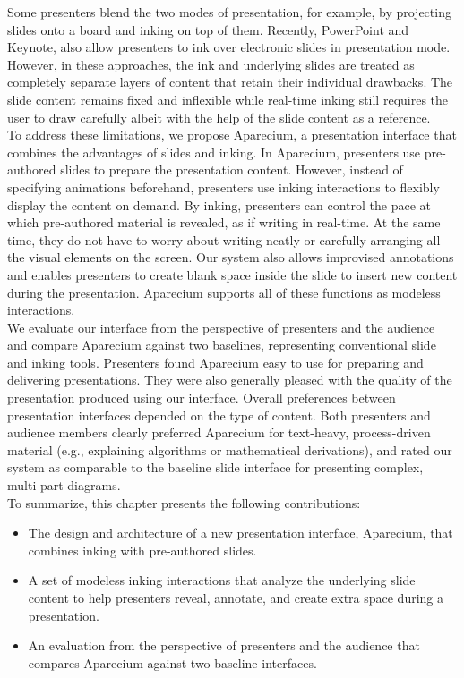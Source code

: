 Some presenters blend the two modes of presentation, for example, by projecting slides onto a board and inking on top of them. Recently, PowerPoint and Keynote, also allow presenters to ink over electronic slides in presentation mode. However, in these approaches, the ink and underlying slides are treated as completely separate layers of content that retain their individual drawbacks. 
%
The slide content remains fixed and inflexible while real-time inking still requires the user to draw carefully albeit with the help of the slide content as a reference.\\

To address these limitations, we propose Aparecium, a presentation interface that combines the advantages of slides and inking.
%
In Aparecium, presenters use pre-authored slides to prepare the presentation content. However, instead of specifying animations beforehand, presenters use inking interactions to flexibly display the content on demand. By inking, presenters can control the pace at which pre-authored material is revealed, as if writing in real-time. At the same time, they do not have to worry about writing neatly or carefully arranging all the visual elements on the screen. Our system also allows improvised annotations and enables presenters to create blank space inside the slide to insert new content during the presentation. Aparecium supports all of these functions as modeless interactions.\\

We evaluate our interface from the perspective of presenters and the audience and compare Aparecium against two baselines, representing conventional slide and inking tools. Presenters found Aparecium easy to use for preparing and delivering presentations. They were also generally pleased with the quality of the presentation produced using our interface. 
%
Overall preferences between presentation interfaces depended on the type of content.
%
Both presenters and audience members clearly preferred Aparecium for text-heavy, process-driven material (e.g., explaining algorithms or mathematical derivations), and rated our system as comparable to the baseline slide interface for presenting complex, multi-part diagrams. \\

To summarize, this chapter presents the following contributions:

\begin{itemize}
  \item The design and architecture of a new presentation interface, Aparecium, that combines inking with pre-authored slides.
\item A set of modeless inking interactions that analyze the underlying slide content to help presenters reveal, annotate, and create extra space during a presentation.
  \item An evaluation from the perspective of presenters and the audience that compares Aparecium against two baseline interfaces.
\end{itemize}


